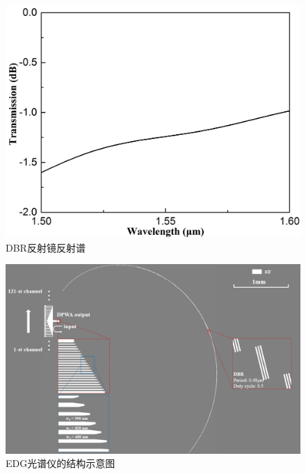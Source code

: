 \begin{figure}[htb]
	\centering
	\includegraphics[width=12cm]{./Pictures/edg_dbr_loss.jpg}
	\captionsetup{justification=centering}
	\caption{DBR反射镜反射谱}
	\label{edg_dbr_loss}
\end{figure}

\begin{figure}[htb]
	\centering
	\includegraphics[width=16cm]{./Pictures/edg_layout.jpg}
	\captionsetup{justification=centering}
	\caption{EDG光谱仪的结构示意图}
	\label{edg_layout}
\end{figure}

